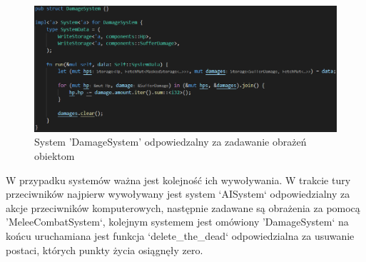 \documentclass[12pt,twoside]{article}
\begin{document}
\FloatBarrier
\begin{figure}[h]
	\centering
	\includegraphics[width=16cm]{images/code/system_damage.png}
	\caption{System 'DamageSystem' odpowiedzalny za zadawanie obrażeń obiektom}
	\label{code:system_damage}
\end{figure}
\FloatBarrier

W przypadku systemów ważna jest kolejność ich wywoływania. W trakcie tury przeciwników najpierw wywoływany jest system `AISystem` odpowiedzialny za akcje przeciwników komputerowych, następnie zadawane są obrażenia za pomocą 'MeleeCombatSystem`, kolejnym systemem jest omówiony 'DamageSystem` na końcu uruchamiana jest funkcja `delete\_the\_dead` odpowiedzialna za usuwanie postaci, których punkty życia osiągnęły zero.
\end{document}
